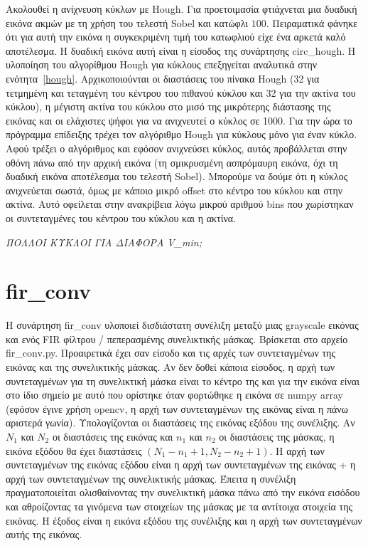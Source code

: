 \documentclass{article}
\begin{document}
Ακολουθεί η ανίχνευση κύκλων με Hough. Για προετοιμασία φτιάχνεται μια δυαδική
εικόνα ακμών με τη χρήση του τελεστή Sobel και κατώφλι $100$. Πειραματικά 
φάνηκε ότι για αυτή την εικόνα η συγκεκριμένη τιμή του κατωφλιού είχε ένα 
αρκετά καλό αποτέλεσμα. Η δυαδική εικόνα αυτή είναι η είσοδος της συνάρτησης 
circ\_hough. Η υλοποίηση του αλγορίθμου Hough για κύκλους επεξηγείται αναλυτικά 
στην ενότητα~\ref{hough}. 
Αρχικοποιούνται οι διαστάσεις του πίνακα Hough (32 για τετμημένη και τεταγμένη
του κέντρου του πιθανού κύκλου και 32 για την ακτίνα του κύκλου), η μέγιστη 
ακτίνα του κύκλου στο μισό της μικρότερης διάστασης της εικόνας και οι ελάχιστες
ψήφοι για να ανιχνευτεί ο κύκλος σε 1000. Για την ώρα το πρόγραμμα επίδειξης 
τρέχει τον αλγόριθμο Hough για κύκλους μόνο για έναν κύκλο. Αφού τρέξει ο
αλγόριθμος και εφόσον ανιχνεύσει κύκλος, αυτός προβάλλεται στην οθόνη πάνω 
από την αρχική εικόνα (τη σμικρυσμένη ασπρόμαυρη εικόνα, όχι τη δυαδική εικόνα
αποτέλεσμα του τελεστή Sobel). Μπορούμε να δούμε ότι η κύκλος ανιχνεύεται σωστά,
όμως με κάποιο μικρό offset στο κέντρο του κύκλου και στην ακτίνα. Αυτό οφείλεται
στην ανακρίβεια λόγω μικρού αριθμού bins που χωρίστηκαν οι συντεταγμένες του 
κέντρου του κύκλου και η ακτίνα.

\emph{ΠΟΛΛΟΙ ΚΥΚΛΟΙ ΓΙΑ ΔΙΑΦΟΡΑ V\_min;} 
\section{fir\_conv}
Η συνάρτηση fir\_conv υλοποιεί δισδιάστατη συνέλιξη μεταξύ μιας grayscale
εικόνας και ενός FIR φίλτρου / πεπερασμένης συνελικτικής μάσκας. Βρίσκεται στο 
αρχείο fir\_conv.py. Προαιρετικά έχει σαν είσοδο και τις αρχές των συντεταγμένων 
της εικόνας και της συνελικτικής μάσκας. Αν δεν δοθεί κάποια είσοδος, η αρχή 
των συντεταγμένων για τη συνελικτική μάσκα είναι το κέντρο της και για την εικόνα
είναι στο ίδιο σημείο με αυτό που ορίστηκε όταν φορτώθηκε η εικόνα σε numpy array
(εφόσον έγινε χρήση opencv, η αρχή των συντεταγμένων της εικόνας είναι η πάνω
αριστερά γωνία). Υπολογίζονται οι διαστάσεις της εικόνας εξόδου της συνέλιξης.
Αν $N_1$ και $N_2$ οι διαστάσεις της εικόνας και $n_1$ και $n_2$ οι διαστάσεις
της μάσκας, η εικόνα εξόδου θα έχει διαστάσεις $(N_1 - n_1 + 1, N_2 - n_2 + 1)$.
Η αρχή των συντεταγμένων της εικόνας εξόδου είναι η αρχή των συντεταγμένων της 
εικόνας + η αρχή των συντεταγμένων της συνελικτικής μάσκας. Έπειτα η συνέλιξη 
πραγματοποιείται ολισθαίνοντας την συνελικτική μάσκα πάνω από την εικόνα εισόδου
και αθροίζοντας τα γινόμενα των στοιχείων της μάσκας με τα αντίτοιχα στοιχεία 
της εικόνας. Η έξοδος είναι η εικόνα εξόδου της συνέλιξης και η αρχή των 
συντεταγμένων αυτής της εικόνας.
\end{document}
